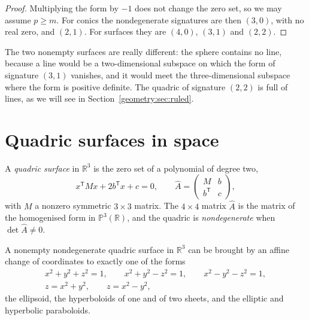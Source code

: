 \begin{proof}
Multiplying the form by $-1$ does not change the zero set, so we may assume $p\ge m$. For conics the nondegenerate signatures are then $(3,0)$, with
no real zero, and $(2,1)$. For surfaces they are $(4,0)$, $(3,1)$ and $(2,2)$.
\end{proof}

The two nonempty surfaces are really different: the sphere contains no line, because a line would be a two-dimensional subspace on which the
form of signature $(3,1)$ vanishes, and it would meet the three-dimensional subspace where the form is positive definite. The quadric of
signature $(2,2)$ is full of lines, as we will see in Section~\ref{geometry:sec:ruled}.

\section{Quadric surfaces in space}

A \emph{quadric surface} in $\mathbb R^3$ is the zero set of a polynomial of degree two,
\[
x^{\mathsf T}Mx+2b^{\mathsf T}x+c=0,\qquad
\hat A=\begin{pmatrix}M&b\\b^{\mathsf T}&c\end{pmatrix},
\]
with $M$ a nonzero symmetric $3\times3$ matrix. The $4\times4$ matrix $\hat A$ is the matrix of the homogenised form in $\mathbb P^3(\mathbb R)$, and
the quadric is \emph{nondegenerate} when $\det\hat A\ne0$.

\begin{theorem}\label{geometry:thm:quadrics}
A nonempty nondegenerate quadric surface in $\mathbb R^3$ can be brought by an affine change of coordinates to exactly one of the forms
\[
\begin{gathered}
x^2+y^2+z^2=1,\qquad x^2+y^2-z^2=1,\qquad x^2-y^2-z^2=1,\\
z=x^2+y^2,\qquad z=x^2-y^2,
\end{gathered}
\]
the ellipsoid, the hyperboloids of one and of two sheets, and the elliptic and hyperbolic paraboloids.
\end{theorem}

